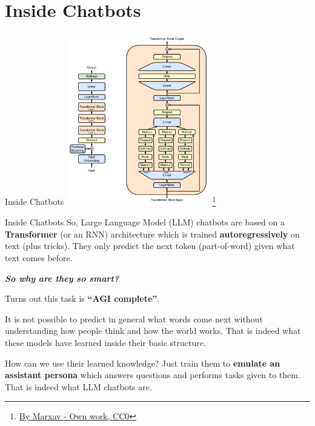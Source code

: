 \documentclass{beamer}
\begin{document}
\section{Inside Chatbots}
\begin{frame}{Inside Chatbots}
\center
\includegraphics[height=7.5cm]{Full_GPT_architecture.png}
\footnote{\textcolor{blue}{\href{https://commons.wikimedia.org/w/index.php?curid=127066752}{By Marxav - Own work, CC0}}}
\end{frame}

\begin{frame}{Inside Chatbots}
So, Large Language Model (LLM) chatbots are based on a \textbf{Transformer} (or an RNN) architecture which is trained \textbf{autoregressively} on text (plus tricks). They only predict the next token (part-of-word) given what text comes before.

\vspace{0.5cm}

\textbf{\textit{So why are they so smart?}}

Turns out this task is \textbf{``AGI complete''}.

It is not possible to predict in general what words come next without understanding how people think and how the world works. That is indeed what these models have learned inside their basic structure.

How can we use their learned knowledge? Just train them to \textbf{emulate an assistant persona} which answers questions and performs tasks given to them. That is indeed what LLM chatbots are.
\end{frame}
\end{document}
